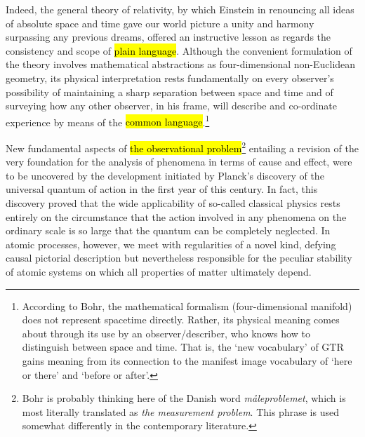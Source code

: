 \documentclass{tufte-handout}
\begin{document}
Indeed, the general theory of relativity, by which Einstein in
renouncing all ideas of absolute space and time gave our world picture
a unity and harmony surpassing any previous dreams, offered an
instructive lesson as regards the consistency and scope of \hl{plain
  language}. Although the convenient formulation of the theory
involves mathematical abstractions as four-dimensional non-Euclidean
geometry, its physical interpretation rests fundamentally on every
observer's possibility of maintaining a sharp separation between space
and time and of surveying how any other observer, in his frame, will
describe and co-ordinate experience by means of the \hl{common
  language}.\footnote{According to Bohr, the mathematical formalism
  (four-dimensional manifold) does not represent spacetime
  directly. Rather, its physical meaning comes about through its use
  by an observer/describer, who knows how to distinguish between space
  and time. That is, the `new vocabulary' of GTR gains meaning from
  its connection to the manifest image vocabulary of `here or there'
  and `before or after'.}

New fundamental aspects of \hl{the observational
  problem}\footnote{Bohr is probably thinking here of the Danish word
  \emph{måleproblemet}, which is most literally translated as
  \emph{the measurement problem}. This phrase is used somewhat
  differently in the contemporary literature.} entailing a revision of
the very foundation for the analysis of phenomena in terms of cause
and effect, were to be uncovered by the development initiated by
Planck's discovery of the universal quantum of action in the first
year of this century. In fact, this discovery proved that the wide
applicability of so-called classical physics rests entirely on the
circumstance that the action involved in any phenomena on the ordinary
scale is so large that the quantum can be completely neglected. In
atomic processes, however, we meet with regularities of a novel kind,
defying causal pictorial description but nevertheless responsible for
the peculiar stability of atomic systems on which all properties of
matter ultimately depend.
\end{document}
